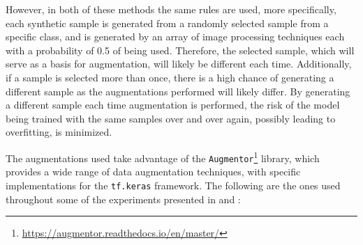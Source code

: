     However, in both of these methods the same rules are used, more specifically, each synthetic sample is generated from a randomly selected sample from a specific class, and is generated by an array of image processing techniques each with a probability of 0.5 of being used. Therefore, the selected sample, which will serve as a basis for augmentation, will likely be different each time. Additionally, if a sample is selected more than once, there is a high chance of generating a different sample as the augmentations performed will likely differ. By generating a different sample each time augmentation is performed, the risk of the model being trained with the same samples over and over again, possibly leading to overfitting, is minimized. \par 
    
    The augmentations used take advantage of the \verb|Augmentor|\footnote{\url{https://augmentor.readthedocs.io/en/master/}} library, which provides a wide range of data augmentation techniques, with specific implementations for the \verb|tf.keras| framework. The following are the ones used throughout some of the experiments presented in  and :
    
